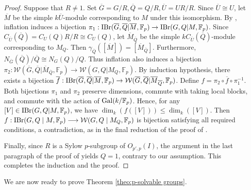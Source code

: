 \documentclass[preprint,12pt,3p]{elsarticle}
\def\IBr{{\rm IBr}}
\def\Gal{{\rm Gal}}
\def\W{\mathcal{W}}
\def\F{\mathbb{F}}
\begin{document}
\begin{proof}
Suppose that $R\neq1$.
Set $\overline G=G/R, \overline Q=Q/R, \overline U=UR/R$.
Since $\overline U \cong U$, let
$\overline M$ be the simple
$k\overline U$-module corresponding
to $M$ under this isomorphism.
By \cite[Lemma 2.32]{Navarro}, inflation induces
a bijection
$\pi_1:\IBr(\overline G,\overline Q
| \overline M,\F_p)
\to
\IBr(G,Q | M,\F_p)$.
Since
$C_{\overline U}(\overline Q)  = C_U(Q) R/R \cong C_U(Q)$,
let $\overline M _{\overline Q}$ be the simple $k C_{\overline U}(\overline Q)$-module corresponding to $M_Q$. Then $\gamma_{\overline{Q}}([\overline M]) = [\overline M _{\overline Q}]$.
Furthermore,
$N_{\overline G}(\overline Q)/
\overline Q
\cong N_G(Q)/Q$.
Thus inflation also
induces a bijection
$\pi_2: \W(\overline G,\overline Q
| \overline M_{\overline Q},\F_p)
\to
\W(G,Q | M_Q,\F_p)$.
By induction hypothesis, there exists a
bijection $\overline f: \IBr(\overline G,\overline Q
| \overline M,\F_p) \to \W(\overline G,\overline Q
| \overline M_{\overline Q},\F_p)$.
Define $f=\pi_2\circ\overline f\circ\pi_1^{-1}$. 
Both bijections $\pi_1$ and $\pi_2$ preserve dimensions, commute with taking local blocks, and commute with the action of $\Gal(k/\F_p)$.
Hence, for any
$[V]\in\IBr(G,Q | M,\F_p)$,
we have
$
\dim_k(f([V]))
\leq\dim_k([V]).
$
Then $f: \IBr(G,Q\mid M,\F_p) \longrightarrow \W(G,Q\mid M_Q,\F_p)$ is bijection satisfying all required conditions, a contradiction,
as in the final reduction of the proof of
\cite[Theorem 7.1]{Turull14}.

Finally, since $R$ is a Sylow $p$-subgroup
of $O_{p',p}(I)$, the argument in the last paragraph of the proof of \cite[Theorem 7.1]{Turull14}
yields $Q=1$, contrary to our assumption.
This completes the induction and
the proof.
\end{proof}

We are now ready to prove
Theorem \ref{theo:p-solvable groups}.
\end{document}
